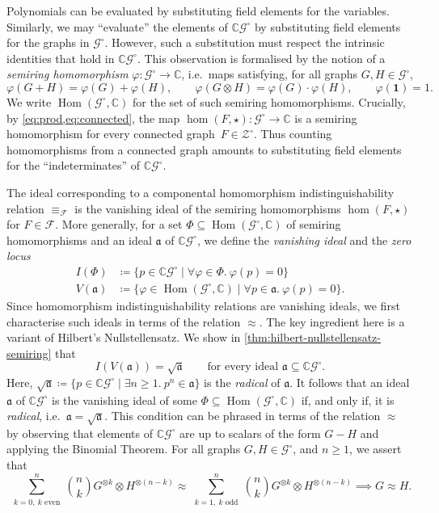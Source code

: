 \documentclass[11pt]{scrartcl}
\theoremstyle{definition}
\theoremstyle{plain}
\theoremstyle{remark}
\renewcommand\phi\varphi
\DeclareMathOperator\Hom{Hom}
\newcommand{\lG}{\mathcal{G}^\circ}
\newcommand{\lZ}{\mathcal{Z}^\circ}
\newcommand{\C}{\mathbb{C}}
\begin{document}
	Polynomials can be evaluated by substituting field elements for the variables. 
	Similarly, we may \enquote{evaluate} the elements of $\mathbb{C}\lG$ by substituting field elements for the graphs in $\lG$.
	However, such a substitution must respect the intrinsic identities that hold in $\mathbb{C}\lG$.
	This observation is formalised by the notion of a \emph{semiring homomorphism} $\phi \colon \lG \to \mathbb{C}$, i.e.\ maps satisfying, for all graphs $G, H \in \lG$,
	\[
		\phi(G + H) = \phi(G) + \phi(H), \qquad
		\phi(G \otimes H) = \phi(G) \cdot \phi(H), \qquad
		\phi(\boldsymbol{1}) = 1.
	\]
	We write $\Hom(\lG, \mathbb{C})$ for the set of such semiring homomorphisms.
	Crucially, by \cref{eq:prod,eq:connected}, the map $\hom(F, \star) \colon \lG \to \mathbb{C}$
	is a semiring homomorphism for every connected graph~$F \in \lZ$.
	Thus counting homomorphisms from a connected graph amounts to substituting field elements for the \enquote{indeterminates} of $\mathbb{C}\lG$.

	The ideal corresponding to a componental homomorphism indistinguishability relation $\equiv_{\mathcal{F}}$ is the vanishing ideal of the semiring homomorphisms $\hom(F, \star)$ for $F \in \mathcal{F}$.
	More generally, for a set $\Phi \subseteq \Hom(\lG, \mathbb{C})$ of semiring homomorphisms and an ideal $\mathfrak{a}$ of $\mathbb{C}\lG$,
	we define the \emph{vanishing ideal} and the \emph{zero locus}
    \begin{align*}
        I(\Phi) &\coloneqq \{p \in \mathbb{C}\lG \mid \forall \phi \in \Phi.\ \phi(p) = 0\}
        \\
        V(\mathfrak{a}) &\coloneqq \{\phi \in \Hom(\lG, \mathbb{C}) \mid \forall p \in \mathfrak{a}.\ \phi(p) = 0\}.
    \end{align*}
	Since homomorphism indistinguishability relations are vanishing ideals, we first characterise such ideals in terms of the relation $\approx$.
	The key ingredient here is a variant of Hilbert's Nullstellensatz.
	We show in \cref{thm:hilbert-nullstellensatz-semiring} that
    \[
		I(V(\mathfrak{a})) = \sqrt{\mathfrak{a}}
        \qquad
        \text{for every ideal } \mathfrak{a} \subseteq \C\lG.
	\]
	Here, $\sqrt{\mathfrak{a}} \coloneqq \{p \in \mathbb{C}\lG \mid \exists n \geq 1.\ p^n \in \mathfrak{a}\}$ is the \emph{radical} of $\mathfrak{a}$.
	It follows that an ideal  $\mathfrak{a}$ of $\mathbb{C}\lG$ is the vanishing ideal of some $\Phi \subseteq \Hom(\lG, \mathbb{C})$
	if, and only if, it is \emph{radical}, i.e.\ $\mathfrak{a} = \sqrt{\mathfrak{a}}$.
	This condition can be phrased in terms of the relation $\approx$ by observing that elements of $\mathbb{C}\lG$ are up to scalars of the form $G - H$ and applying the Binomial Theorem.
	For all graphs $G, H \in \lG$, and $n \geq 1$, we assert that
	\begin{equation}\label{eq:h5}
		\sum_{\substack{k=0,\ k \text{ even}}}^n \binom{n}{k} G^{\otimes k} \otimes H^{\otimes (n-k)}
		\approx 
		\sum_{\substack{k=1,\ k \text{ odd}}}^n \binom{n}{k} G^{\otimes k} \otimes H^{\otimes (n-k)}
		\implies
		G \approx H.
	\end{equation}
\end{document}
